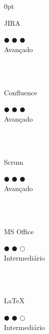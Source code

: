 \documentclass[a4paper]{article}
\begin{document}
\begin{adjustwidth}{\parindent}{0pt}
\begin{minipage}[t]{0.25\textwidth}
 \begin{minipage}{0.65\textwidth}
  \small{JIRA}
 \end{minipage}
 \begin{minipage}{0.3\textwidth}
  \centering $\mdlgblkcircle$ $\mdlgblkcircle$ $\mdlgblkcircle$ \\  \footnotesize{Avançado}
 \end{minipage} \\ \hspace{0pt} \\

 \begin{minipage}{0.65\textwidth}
  \small{Confluence}
 \end{minipage}
 \begin{minipage}{0.3\textwidth}
  \centering $\mdlgblkcircle$ $\mdlgblkcircle$ $\mdlgblkcircle$ \\  \footnotesize{Avançado}
 \end{minipage} \\ \hspace{0pt} \\

 \begin{minipage}{0.65\textwidth}
  \small{Scrum}
 \end{minipage}
 \begin{minipage}{0.3\textwidth}
  \centering $\mdlgblkcircle$ $\mdlgblkcircle$ $\mdlgblkcircle$ \\  \footnotesize{Avançado}
 \end{minipage} \\ \hspace{0pt} \\

 \begin{minipage}{0.65\textwidth}
  \small{MS Office}
\end{minipage}
\begin{minipage}{0.3\textwidth}
  \centering $\mdlgblkcircle$ $\mdlgblkcircle$ $\mdlgwhtcircle$ \\  \footnotesize{\mbox{Intermediário}}
\end{minipage} \\ \hspace{0pt} \\

\begin{minipage}{0.65\textwidth}
  \small{\LaTeX}
\end{minipage}
\begin{minipage}{0.3\textwidth}
  \centering $\mdlgblkcircle$ $\mdlgblkcircle$ $\mdlgwhtcircle$ \\  \footnotesize{\mbox{Intermediário}}
\end{minipage} \\ \hspace{0pt} \\
 

\end{minipage}
\end{adjustwidth}
\end{document}
